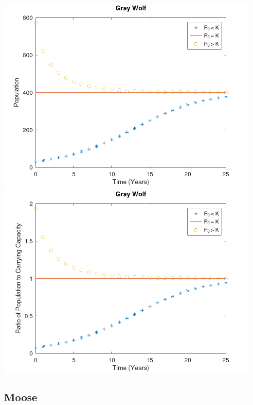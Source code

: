 \documentclass[12pt]{article}
\begin{document}
\begin{center}
  \includegraphics[width=.75\textwidth]{Images/GrayWolf.png}
  \includegraphics[width=.75\textwidth]{Images/GrayWolfCC.png}
\end{center}

\subsection{Moose}
\end{document}
